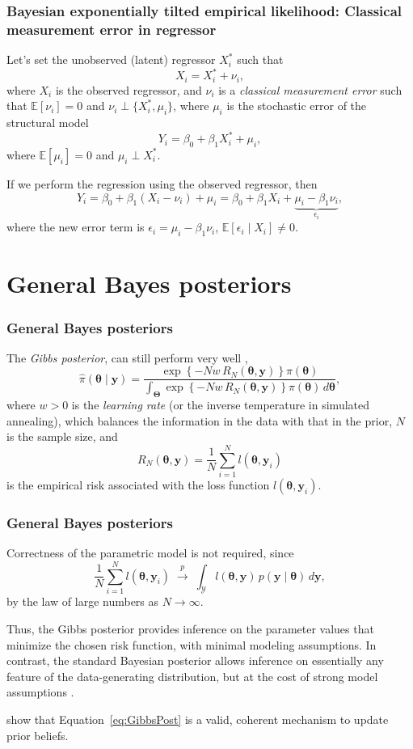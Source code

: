 \documentclass[12pt, compress]{beamer}
\begin{document}
\begin{frame}
	\frametitle{Bayesian exponentially tilted empirical likelihood: Classical measurement error in regressor}
Let's set the unobserved (latent) regressor $X_i^*$ such that
\[
X_i = X_i^* + \nu_i,
\]
where $X_i$ is the observed regressor, and $\nu_i$ is a \textit{classical measurement error} such that 
$\mathbb{E}[\nu_i]=0$ and $\nu_i \perp \{X_i^*,\mu_i\}$, where $\mu_i$ is the stochastic error of the structural model
\[
Y_i=\beta_0+\beta_1X_i^*+\mu_i,
\] 
where $\mathbb{E}[\mu_i]=0$ and $\mu_i\perp X_i^*$.

If we perform the regression using the observed regressor, then
\[
Y_i=\beta_0+\beta_1(X_i-\nu_i)+\mu_i
=\beta_0+\beta_1X_i+\underbrace{\mu_i-\beta_1\nu_i}_{\epsilon_i},
\]
where the new error term is $\epsilon_i=\mu_i-\beta_1\nu_i$, \(
\mathbb{E}[\epsilon_i\mid X_i]\neq 0.
\)
\end{frame}

\section{General Bayes posteriors}

\begin{frame}
	\frametitle{General Bayes posteriors}
The \textit{Gibbs posterior}, can still perform very well \citep{Jiang2008},
\begin{equation}\label{eq:GibbsPost}
	\hat{\pi}(\boldsymbol{\theta}\mid\mathbf{y})
	=\frac{\exp\left\{-Nw\,R_N(\boldsymbol{\theta},\mathbf{y})\right\}\pi(\boldsymbol{\theta})}
	{\int_{\boldsymbol{\Theta}}\exp\left\{-Nw\,R_N(\boldsymbol{\theta},\mathbf{y})\right\}\pi(\boldsymbol{\theta})\,d\boldsymbol{\theta}},
\end{equation}
where $w>0$ is the \textit{learning rate} (or the inverse temperature in simulated annealing), which balances the information in the data with that in the prior, $N$ is the sample size, and
\[
R_N(\boldsymbol{\theta},\mathbf{y})=\frac{1}{N}\sum_{i=1}^N l(\boldsymbol{\theta},\mathbf{y}_i)
\]
is the empirical risk associated with the loss function $l(\boldsymbol{\theta},\mathbf{y}_i)$.
\end{frame}

\begin{frame}
	\frametitle{General Bayes posteriors}
Correctness of the parametric model is not required, since
\[
\frac{1}{N}\sum_{i=1}^N l(\boldsymbol{\theta},\mathbf{y}_i)\;\stackrel{p}{\longrightarrow}\;\int_{\mathcal{Y}} l(\boldsymbol{\theta},\mathbf{y})\,p(\mathbf{y}\mid \boldsymbol{\theta})\,d\mathbf{y},
\]
by the law of large numbers as $N\to\infty$.

Thus, the Gibbs posterior provides inference on the parameter values that minimize the chosen risk function, with minimal modeling assumptions. In contrast, the standard Bayesian posterior allows inference on essentially any feature of the data-generating distribution, but at the cost of strong model assumptions \citep{Syring2019}.

\cite{bissiri2016general} show that Equation~\ref{eq:GibbsPost} is a valid, coherent mechanism to update prior beliefs.
\end{frame}
\end{document}
